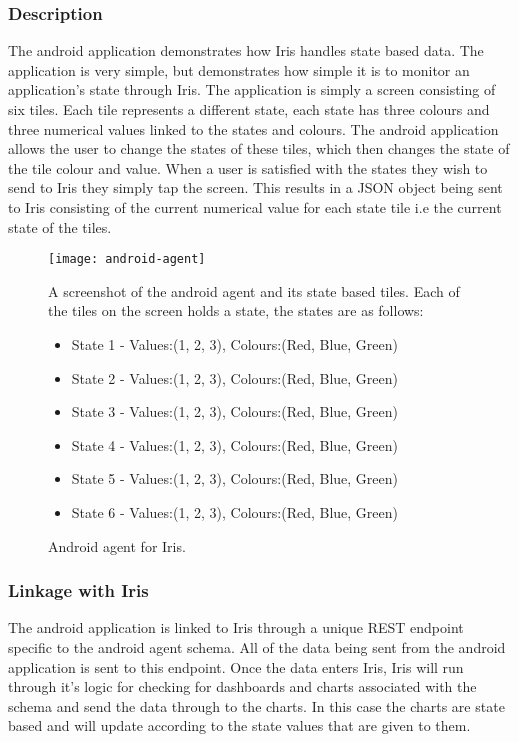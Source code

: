 \documentclass[12pt,a4paper,titlepage]{report}
\begin{document}
\subsubsection{Description}
The android application demonstrates how Iris handles state based data. The application is very simple, but demonstrates how simple it is to monitor an application's state through Iris. The application is simply a screen consisting of six tiles. Each tile represents a different state, each state has three colours and three numerical values linked to the states and colours. The android application allows the user to change the states of these tiles, which then changes the state of the tile colour and value. When a user is satisfied with the states they wish to send to Iris they simply tap the screen. This results in a JSON object being sent to Iris consisting of the current numerical value for each state tile i.e the current state of the tiles.
\begin{figure}[H]
\begin{tcolorbox}
\begin{center}
\texttt{[image: android-agent]}
\end{center}
A screenshot of the android agent and its state based tiles. Each of the tiles on the screen holds a state, the states are as follows:
\begin{itemize}
    \item State 1 - Values:(1, 2, 3), Colours:(Red, Blue, Green)
    \item State 2 - Values:(1, 2, 3), Colours:(Red, Blue, Green) 
    \item State 3 - Values:(1, 2, 3), Colours:(Red, Blue, Green) 
    \item State 4 - Values:(1, 2, 3), Colours:(Red, Blue, Green) 
    \item State 5 - Values:(1, 2, 3), Colours:(Red, Blue, Green) 
    \item State 6 - Values:(1, 2, 3), Colours:(Red, Blue, Green) 
\end{itemize}
\end{tcolorbox}
\caption{Android agent for Iris.}
\end{figure}

\subsubsection{Linkage with Iris}
The android application is linked to Iris through a unique REST endpoint specific to the android agent schema. All of the data being sent from the android application is sent to this endpoint. Once the data enters Iris, Iris will run through it's logic for checking for dashboards and charts associated with the schema and send the data through to the charts. 
In this case the charts are state based and will update according to the state values that are given to them.
\end{document}
